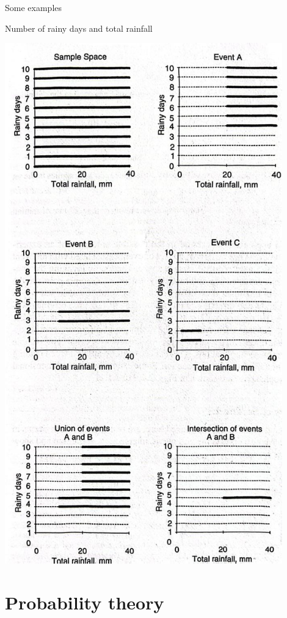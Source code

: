 \documentclass[8pt]{beamer}
\begin{document}
\begin{frame}{Some examples}
\begin{minipage}{0.59\textwidth}
\begin{exampleblock}{Number of rainy days and total rainfall}
    \end{exampleblock}
\end{minipage}
\hfill
    \begin{minipage}{0.39\textwidth}
        \includegraphics[width=0.9\textwidth]{fi218.jpeg}
    \end{minipage}
\end{frame}


\section{Probability theory}
\end{document}
